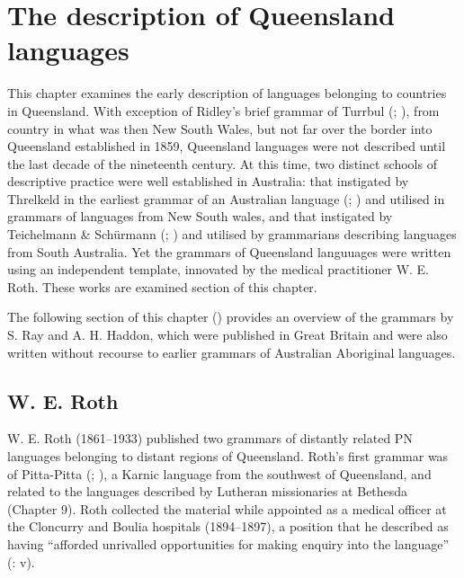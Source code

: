 \chapter{The description of Queensland languages}
\label{chap:key:10}

{This chapter examines} the early description of languages belonging to countries in Queensland. With exception of Ridley’s brief grammar of Turrbul (\citeyear{ridley_kamilaroi_1866}; ), from country in what was then New South Wales, but not far over the border into Queensland established in 1859, Queensland languages were not described until the last decade of the nineteenth century. At this time, two distinct schools of descriptive practice were well established in Australia: that instigated by Threlkeld in the earliest grammar of an Australian language (\citeyear{threlkeld_australian_1834}; ) and utilised in grammars of languages from New South wales, and that instigated by Teichelmann \& Schürmann (\citeyear{teichelmann_outlines_1840}; ) and utilised by grammarians describing languages from South Australia. Yet the grammars of Queensland languuages were written using an independent template, innovated by the medical practitioner W. E. Roth. These works are examined section  of this chapter.

The following section of this chapter () provides an overview of the grammars by S. Ray and A. H. Haddon, which were published in Great Britain and were also written without recourse to earlier grammars of Australian Aboriginal languages.

\section{W. E. Roth}
\label{sec:key:10.1}\label{bkm:Ref74336027}\label{bkm:Ref516423289}\label{bkm:Ref516157254}\label{bkm:Ref514608531}\label{bkm:Ref514606393}
W. E. Roth (1861--1933) published two grammars of distantly related PN languages belonging to distant regions of Queensland. Roth’s first grammar was of Pitta-Pitta (\citeyear{roth_ethnological_1897}; ), a Karnic language from the southwest of Queensland, and related to the languages described by Lutheran missionaries at Bethesda (Chapter 9). Roth collected the material while appointed as a medical officer at the Cloncurry and Boulia hospitals (1894--1897), a position that he described as having “afforded unrivalled opportunities for making enquiry into the language” (\citealt{roth_ethnological_1897}: v).


